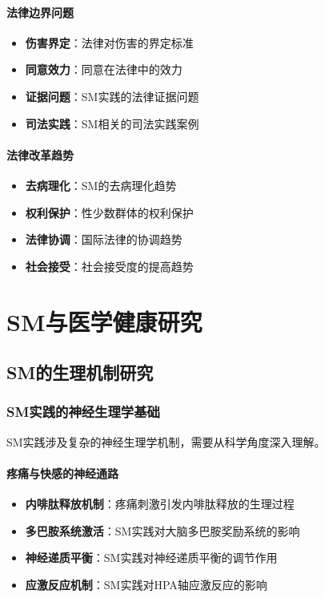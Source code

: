 \documentclass[12pt,UTF8]{ctexbook}
\begin{document}
\subsection{法律边界问题}
\begin{itemize}[leftmargin=2cm]
	\item \textbf{伤害界定}：法律对伤害的界定标准
	\item \textbf{同意效力}：同意在法律中的效力
	\item \textbf{证据问题}：SM实践的法律证据问题
	\item \textbf{司法实践}：SM相关的司法实践案例
\end{itemize}

\subsection{法律改革趋势}
\begin{itemize}[leftmargin=2cm]
	\item \textbf{去病理化}：SM的去病理化趋势
	\item \textbf{权利保护}：性少数群体的权利保护
	\item \textbf{法律协调}：国际法律的协调趋势
	\item \textbf{社会接受}：社会接受度的提高趋势
\end{itemize}

\part{SM与医学健康研究}

\chapter{SM的生理机制研究}
\section{SM实践的神经生理学基础}
SM实践涉及复杂的神经生理学机制，需要从科学角度深入理解。

\subsection{疼痛与快感的神经通路}
\begin{itemize}[leftmargin=2cm]
	\item \textbf{内啡肽释放机制}：疼痛刺激引发内啡肽释放的生理过程
	\item \textbf{多巴胺系统激活}：SM实践对大脑多巴胺奖励系统的影响
	\item \textbf{神经递质平衡}：SM实践对神经递质平衡的调节作用
	\item \textbf{应激反应机制}：SM实践对HPA轴应激反应的影响
\end{itemize}
\end{document}
